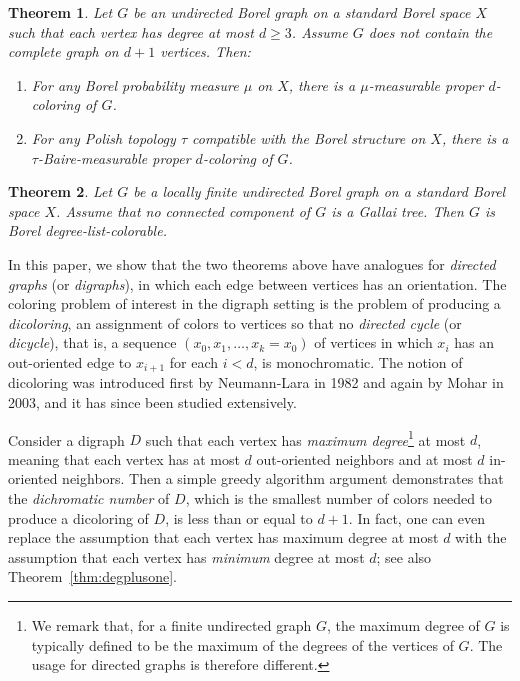 \documentclass[psamsfonts]{amsart}
\newtheorem{thm}{Theorem}[section]
\theoremstyle{definition}
\theoremstyle{remark}
\numberwithin{equation}{section}
\begin{document}
\begin{thm}
    \cite[Theorem~1.2]{cmt2016} Let $G$ be an undirected Borel graph on a standard Borel space $X$ such that each vertex has degree at most $d \geq 3$. Assume $G$ does not contain the complete graph on $d + 1$ vertices. Then:
    \begin{enumerate}
        \item For any Borel probability measure $\mu$ on $X$, there is a $\mu$-measurable proper $d$-coloring of $G$.
        \item For any Polish topology $\tau$ compatible with the Borel structure on $X$, there is a $\tau$-Baire-measurable proper $d$-coloring of $G$.
    \end{enumerate}
\end{thm}

\begin{thm}
    \cite[Theorem~1.4]{cmt2016} Let $G$ be a locally finite undirected Borel graph on a standard Borel space $X$. Assume that no connected component of $G$ is a Gallai tree. Then $G$ is Borel degree-list-colorable.
\end{thm}

In this paper, we show that the two theorems above have analogues for {\it directed graphs} (or {\it digraphs}), in which each edge between vertices has an orientation. The coloring problem of interest in the digraph setting is the problem of producing a {\it dicoloring}, an assignment of colors to vertices so that no {\it directed cycle} (or {\it dicycle}), that is, a sequence $(x_0, x_1, \dots, x_k = x_0)$ of vertices in which $x_i$ has an out-oriented edge to $x_{i + 1}$ for each $i < d$, is monochromatic. The notion of dicoloring was introduced first by Neumann-Lara \cite{nl1982} in 1982 and again by Mohar \cite{mohar2003} in 2003, and it has since been studied extensively.

Consider a digraph $D$ such that each vertex has {\it maximum degree}\footnote{We remark that, for a finite undirected graph $G$, the maximum degree of $G$ is typically defined to be the maximum of the degrees of the vertices of $G$. The usage for directed graphs is therefore different.} at most $d$, meaning that each vertex has at most $d$ out-oriented neighbors and at most $d$ in-oriented neighbors. Then a simple greedy algorithm argument demonstrates that the {\it dichromatic number} of $D$, which is the smallest number of colors needed to produce a dicoloring of $D$, is less than or equal to $d + 1$. In fact, one can even replace the assumption that each vertex has maximum degree at most $d$ with the assumption that each vertex has \emph{minimum} degree at most $d$; see also Theorem~\ref{thm:degplusone}. 
\end{document}
